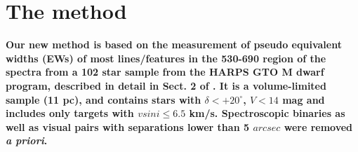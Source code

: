 \documentclass[referee]{aa}
\begin{document}








\section{The method}
\label{sec:calib}

\textbf{Our new method is based on the measurement of pseudo equivalent widths (EWs) of most lines/features in the 530-690 region of the spectra from a 102 star sample from the HARPS GTO M dwarf program, described in detail in Sect. 2 of \citep{Bonfils-2013}. It is a volume-limited sample (11 pc), and contains stars with  $\delta< +20^{\circ}$, $V < 14$ mag and includes only targets with $vsini\le 6.5$ km/s. Spectroscopic binaries as well as visual pairs with separations lower than 5 $arcsec$ were removed \textit{a priori}.}
\end{document}
